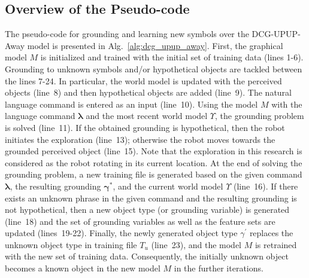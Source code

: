 \subsection{Overview of the Pseudo-code}
The pseudo-code for grounding and learning new symbols over the DCG-UPUP-Away model is presented in Alg.~\ref{alg:dcg_upup_away}. First, the graphical model $M$ is initialized and trained with the initial set of training data (lines 1-6). Grounding to unknown symbols and/or hypothetical objects are tackled between the lines 7-24. In particular, the world model is updated with the perceived objects (line~8) and then hypothetical objects are added (line~9). The natural language command is entered as an input (line~10). Using the model $M$ with the language command $\boldsymbol\lambda$ and the most recent world model $\Upsilon$, the grounding problem is solved (line~11). If the obtained grounding is hypothetical, then the robot initiates the exploration (line~13); otherwise the robot moves towards the grounded perceived object (line~15). Note that the exploration in this research is considered as the robot rotating in its current location. At the end of solving the grounding problem, a new training file is generated based on the given command $\boldsymbol\lambda$, the resulting grounding $\boldsymbol\gamma^*$, and the current world model $\Upsilon$ (line~16). If there exists an unknown phrase in the given command and the resulting grounding is not hypothetical, then a new object type (or grounding variable) is generated (line~18) and the set of grounding variables as well as the feature sets are updated (lines~19-22). Finally, the newly generated object type $\gamma^\prime$ replaces the unknown object type in training file $T_u$ (line~23), and the model $M$ is retrained with the new set of training data. Consequently, the initially unknown object becomes a known object in the new model $M$ in the further iterations. 



